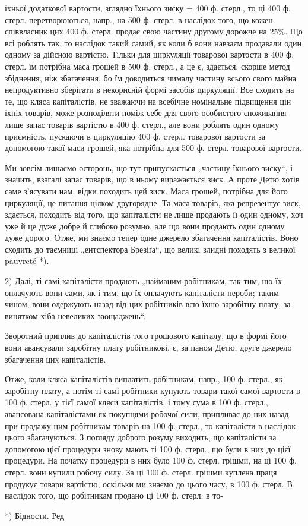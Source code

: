 їхньої додаткової вартости, зглядно їхнього зиску = 400 ф. стерл., то
ці 400 ф. стерл. перетворюються, напр., на 500 ф. стерл. в наслідок
того, що кожен співвласник цих 400 ф. стерл. продає свою частину другому
дорожче на 25\%. Що всі роблять так, то наслідок такий самий,
як коли б вони навзаєм продавали один одному за дійсною вартістю.
Тільки для циркуляції товарової вартости в 400 ф. стерл. їм потрібна
маса грошей в 500 ф. стерл., а це є, здається, скорше метод збіднення,
ніж збагачення, бо їм доводиться чималу частину всього свого майна
непродуктивно зберігати в некорисній формі засобів циркуляції. Все
сходить на те, що кляса капіталістів, не зважаючи на всебічне номінальне
підвищення цін їхніх товарів, може розподіляти поміж себе для свого
особистого споживання лише запас товарів вартістю в 400 ф.
стерл., але вони роблять один одному приємність, пускаючи в циркуляцію
400 ф. стерл. товарової вартости за допомогою такої маси грошей,
яка потрібна для 500 ф. стерл. товарової вартости.

Ми зовсім лишаємо осторонь, що тут припускається „частину їхнього
зиску“, і значить, взагалі запас товарів, що в ньому виражається зиск.
А проте Детю хотів саме з’ясувати нам, відки походить цей зиск. Маса
грошей, потрібна для його циркуляції, це питання цілком другорядне. Та маса
товарів, яка репрезентує зиск, здається, походить від того, що капіталісти
не лише продають її один одному, хоч уже й це дуже добре й
глибоко розумно, але що вони продають один одному дуже дорого.
Отже, ми знаємо тепер одне джерело збагачення капіталістів. Воно сходить
до таємниці „ентспектора Брезіґа“, що великі злидні походять з великої
pauvreté *).

2) Далі, ті самі капіталісти продають „найманим робітникам, так тим,
що їх оплачують вони сами, як і тим, що їх оплачують капіталісти-нероби;
таким чином, вони одержують назад від цих робітників всю їхню заробітну
плату, за винятком хіба невеликих заощаджень“.

Зворотний приплив до капіталістів того грошового капіталу, що
в формі його вони авансували заробітну плату робітникові, є, за паном
Детю, друге джерело збагачення цих капіталістів.

Отже, коли кляса капіталістів виплатить робітникам, напр., 100 ф. стерл.,
як заробітну плату, а потім ті самі робітники купують товари такої самої
вартости в 100 ф. стерл. у тієї самої кляси капіталістів, і тому сума
в 100 ф. стерл., авансована капіталістами як покупцями робочої сили,
припливає до них назад при продажу цим робітникам товарів на 100 ф.
стерл., то капіталісти в наслідок цього збагачуються. З погляду
доброго розуму виходить, що капіталісти за допомогою цієї процедури
знову мають ті 100 ф. стерл., що були в них до цієї процедури. На
початку процедури в них було 100 ф. стерл. грішми, на ці 100 ф. стерл.
вони купили робочу силу. За ці 100 ф. стерл. грішми куплена праця
продукує товари вартістю, оскільки ми знаємо до цього часу, в 100 ф.
стерл. В наслідок того, що робітникам продано ці 100 ф. стерл. в то-

*) Бідности. Ред
